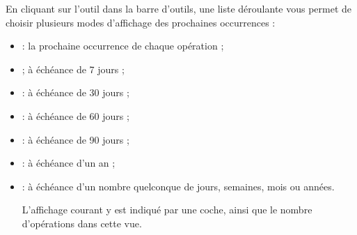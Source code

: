 En cliquant sur l'outil   dans la barre d'outils, une liste déroulante vous permet de choisir plusieurs modes d'affichage des prochaines occurrences :

\begin{itemize}
	\ifIllustration
	\label{planned-transactions-display-img}
	\fi
	 \item {} : la prochaine occurrence de chaque opération ; 
	 \item {} ; à échéance de 7 jours ;
	 \item {} : à échéance de 30 jours ;
	 \item {} : à échéance de 60 jours  ;
	 \item {} : à échéance de 90 jours  ;
	 \item {} : à échéance d'un an ;
	 \item {} : à échéance d'un nombre quelconque de jours, semaines, mois ou années.

	 L'affichage courant y est indiqué par une coche, ainsi que le nombre d'opérations dans cette vue.
\end{itemize}

